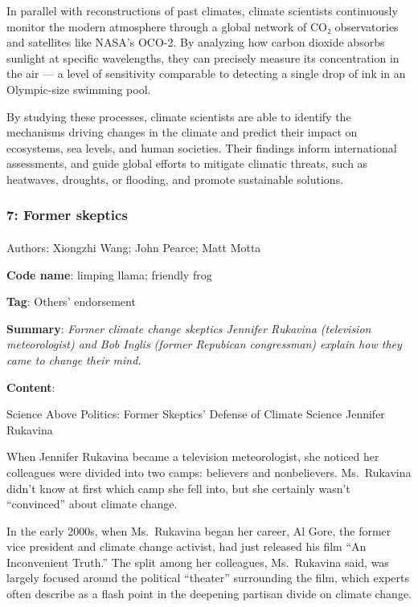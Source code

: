 \documentclass[
  letterpaper,
  DIV=11,
  numbers=noendperiod]{scrartcl}
\makeatletter
\let\oldparagraph\paragraph
\renewcommand{\paragraph}{
    \@ifstar
      \xxxParagraphStar
      \xxxParagraphNoStar
  }
\newcommand{\xxxParagraphStar}[1]{\oldparagraph*{#1}\mbox{}}
\newcommand{\xxxParagraphNoStar}[1]{\oldparagraph{#1}\mbox{}}
\makeatother
\begin{document}
In parallel with reconstructions of past climates, climate scientists
continuously monitor the modern atmosphere through a global network of
CO₂ observatories and satellites like NASA's OCO-2. By analyzing how
carbon dioxide absorbs sunlight at specific wavelengths, they can
precisely measure its concentration in the air --- a level of
sensitivity comparable to detecting a single drop of ink in an
Olympic-size swimming pool.

By studying these processes, climate scientists are able to identify the
mechanisms driving changes in the climate and predict their impact on
ecosystems, sea levels, and human societies. Their findings inform
international assessments, and guide global efforts to mitigate climatic
threats, such as heatwaves, droughts, or flooding, and promote
sustainable solutions.

\subsubsection{7: Former skeptics}\label{former-skeptics}

\paragraph{Authors: Xiongzhi Wang; John Pearce; Matt
Motta}\label{authors-xiongzhi-wang-john-pearce-matt-motta}

\textbf{Code name}: limping llama; friendly frog

\textbf{Tag}: Others' endorsement

\textbf{Summary}: \emph{Former climate change skeptics Jennifer Rukavina
(television meteorologist) and Bob Inglis (former Repubican congressman)
explain how they came to change their mind.}

\textbf{Content}:

Science Above Politics: Former Skeptics' Defense of Climate Science
Jennifer Rukavina

When Jennifer Rukavina became a television meteorologist, she noticed
her colleagues were divided into two camps: believers and nonbelievers.
Ms.~Rukavina didn't know at first which camp she fell into, but she
certainly wasn't ``convinced'' about climate change.

In the early 2000s, when Ms.~Rukavina began her career, Al Gore, the
former vice president and climate change activist, had just released his
film ``An Inconvenient Truth.'' The split among her colleagues,
Ms.~Rukavina said, was largely focused around the political ``theater''
surrounding the film, which experts often describe as a flash point in
the deepening partisan divide on climate change.
\end{document}

